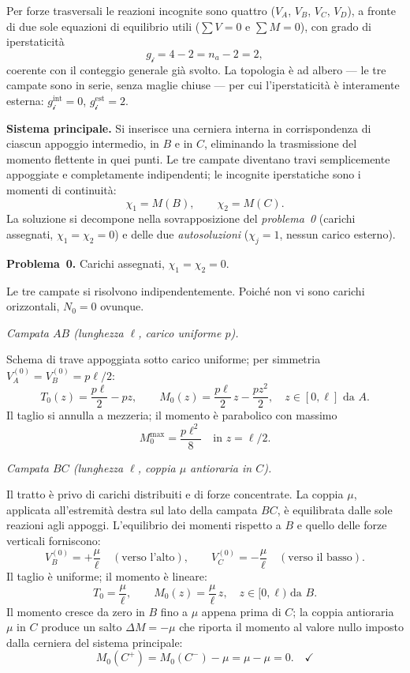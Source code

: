 Per forze trasversali le reazioni incognite sono quattro
($V_A$, $V_B$, $V_C$, $V_D$), a fronte di due sole equazioni
di equilibrio utili ($\sum V = 0$ e $\sum M = 0$), con
grado di iperstaticità
\[
g_\mathscr{i} = 4 - 2 = n_a - 2 = 2,
\]
coerente con il conteggio generale già svolto.
La topologia è ad albero --- le tre campate sono in serie,
senza maglie chiuse --- per cui l'iperstaticità è interamente
esterna: $g_\mathscr{i}^{\mathrm{int}} = 0$,
$g_\mathscr{i}^{\mathrm{est}} = 2$.

\medskip
\noindent\textbf{Sistema principale.}
Si inserisce una cerniera interna in corrispondenza di
ciascun appoggio intermedio, in $B$ e in $C$, eliminando
la trasmissione del momento flettente in quei punti.
Le tre campate diventano travi semplicemente appoggiate e
completamente indipendenti; le incognite iperstatiche sono
i momenti di continuità:
\[
\chi_1 = M(B), \qquad \chi_2 = M(C).
\]
La soluzione si decompone nella sovrapposizione del
\emph{problema~0} (carichi assegnati, $\chi_1 = \chi_2 = 0$)
e delle due \emph{autosoluzioni}
($\chi_j = 1$, nessun carico esterno).

\medskip
\noindent\textbf{Problema~0.}
Carichi assegnati, $\chi_1 = \chi_2 = 0$.

Le tre campate si risolvono indipendentemente.
Poiché non vi sono carichi orizzontali, $N_0 = 0$ ovunque.

\medskip
\noindent\textit{Campata $AB$
(lunghezza $\ell$, carico uniforme $p$).}

Schema di trave appoggiata sotto carico uniforme;
per simmetria $V_A^{(0)} = V_B^{(0)} = p\ell/2$:
\[
T_0(z) = \frac{p\ell}{2} - pz, \qquad
M_0(z) = \frac{p\ell}{2}\,z - \frac{pz^2}{2},
\quad z \in [0,\ell] \text{ da } A.
\]
Il taglio si annulla a mezzeria; il momento è parabolico
con massimo
\[
M_0^{\max} = \frac{p\ell^2}{8} \quad \text{in } z = \ell/2.
\]

\medskip
\noindent\textit{Campata $BC$
(lunghezza $\ell$, coppia $\mu$ antioraria in $C$).}

Il tratto è privo di carichi distribuiti e di forze
concentrate. La coppia $\mu$, applicata all'estremità
destra sul lato della campata $BC$, è equilibrata
dalle sole reazioni agli appoggi. L'equilibrio dei
momenti rispetto a $B$ e quello delle forze verticali
forniscono:
\[
V_B^{(0)} = +\frac{\mu}{\ell}
\quad (\text{verso l'alto}), \qquad
V_C^{(0)} = -\frac{\mu}{\ell}
\quad (\text{verso il basso}).
\]
Il taglio è uniforme; il momento è lineare:
\[
T_0 = \frac{\mu}{\ell}, \qquad
M_0(z) = \frac{\mu}{\ell}\,z, \quad z \in [0,\ell) \text{ da } B.
\]
Il momento cresce da zero in $B$ fino a $\mu$ appena
prima di $C$; la coppia antioraria $\mu$ in $C$ produce
un salto $\Delta M = -\mu$ che riporta il momento al
valore nullo imposto dalla cerniera del sistema principale:
\[
M_0(C^+) = M_0(C^-) - \mu = \mu - \mu = 0.
\quad\checkmark
\]

